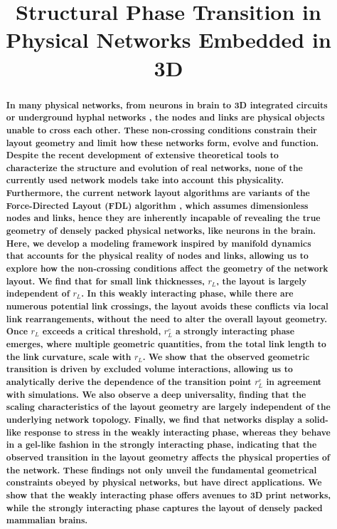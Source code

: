 \documentclass[nofootinbib,preprint,floatfix,titlepage,endfloats,superscriptaddress]{revtex4} %
\newcommand{\outNim}[1]{}
\begin{document}
\linespread{1.2}
\title{\Large Structural Phase Transition in Physical Networks Embedded in 3D}
\outNim{
\medskip
\centerline{Nima Dehmamy\footnote{nidami@gmail.com}, Soodabeh Milanlouei, Albert-L\'aszl\'o Barab\'asi}
\centerline{\today}
\bigskip
}
  \begin{abstract}
{\bf 
In many physical networks, from neurons in brain \cite{kasthuri2015saturated,oh2014mesoscale} to 3D integrated circuits \cite{wong2007monolithic,shulaker2014monolithic} %
or underground hyphal networks \cite{friese1991spread,bago1998architecture}, the nodes and links are physical objects unable to cross each other.
These non-crossing conditions constrain their layout geometry and limit how these networks form, evolve and function. 
Despite the recent development of extensive theoretical tools to characterize the structure and evolution of real networks\cite{barrat2008dynamical,newman2010networks,caldarelli2012networks}, none of the currently used network models take into account this physicality. 
Furthermore, the current network layout algorithms are variants of the Force-Directed Layout (FDL) algorithm \cite{kamada1989algorithm,davidson1996drawing,fruchterman1991graph,barnes1986hierarchical}, which assumes dimensionless nodes and links, hence they are inherently incapable of revealing the true geometry of densely packed physical networks, like neurons in the brain.
Here, we develop a modeling framework inspired by manifold dynamics that accounts for the physical reality of nodes and links, allowing us to 
explore how the non-crossing conditions affect the geometry of the network layout. 
We find that for small link thicknesses, $r_L$, the layout is largely independent of $r_L$. 
In this weakly interacting phase, while there are numerous potential link crossings, the layout avoids these conflicts via local link rearrangements, without the need to alter the overall layout geometry. 
Once $r_L$ exceeds a critical threshold, $r_L^c$ a strongly interacting phase emerges, where multiple geometric quantities, from the total link length to the link curvature, scale with $r_L$. 
We show that the observed geometric transition is driven by excluded volume interactions, allowing us to analytically derive the dependence of the transition point $r_L^c$ in agreement with simulations.
We also
observe a deep universality, finding that the scaling characteristics of the layout geometry are largely independent of the underlying network topology. 
Finally, we find that networks display a solid-like response to stress in the weakly interacting phase, whereas they behave in a gel-like fashion in the strongly interacting phase, indicating that the observed transition in the layout geometry affects the physical properties of the network. 
These findings not only unveil the fundamental geometrical constraints obeyed by physical networks, but have direct applications. We show that the weakly interacting phase offers avenues to 3D print networks, while the strongly interacting phase captures the layout of densely packed mammalian brains.
} 
\end{abstract}
\end{document}
